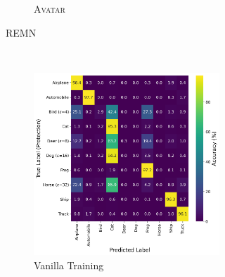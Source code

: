 \documentclass[conference]{IEEEtran}
\theoremstyle{definition}
\theoremstyle{remark}
\theoremstyle{proposition}
\begin{document}
\begin{figure}[tb!]
\begin{subfigure}{1.0\textwidth}
\begin{subfigure}{.40\textwidth}
            \caption*{\textsc{Avatar}}
    	\end{subfigure}
	\caption{REMN~\citep{fu2022remn}}
    \vspace*{2em}
    \end{subfigure}
        \\
    \begin{subfigure}{1.0\textwidth}
    \centering
        \begin{subfigure}{.40\textwidth}
    		\centering
    		\includegraphics[width=1.0\textwidth]{combination_attacks/ResNet18_SHR_eps_combo_t_0_confusion_matrix.png}
            \caption*{Vanilla Training}
    	\end{subfigure}
     \hspace{5em}
        \begin{subfigure}{.40\textwidth}
    		\centering

\end{subfigure}
\end{subfigure}
\end{figure}
\end{document}
